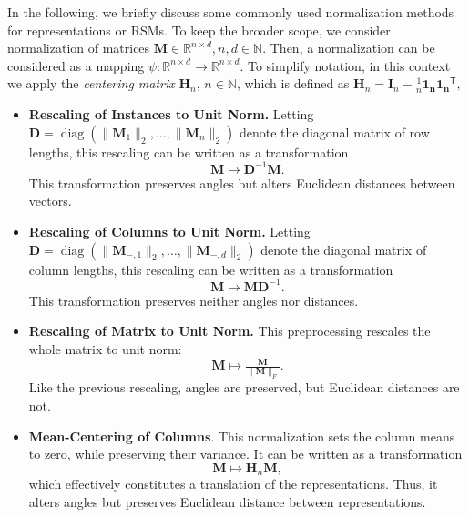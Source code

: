 \documentclass{article}
\newcommand{\Nat}{\mathbb{N}}
\newcommand{\Real}{\mathbb{R}}
\newcommand{\transp}{\mathsf{T}}
\begin{document}
\begin{refsegment}
In the following, we briefly discuss some commonly used normalization methods for representations or RSMs.
To keep the broader scope, we consider normalization of matrices $\bm{M}\in\Real^{n\times d}, n,d\in\Nat$.
Then, a normalization can be considered as a mapping $\psi:\Real^{n\times d} \longrightarrow \Real^{n\times d}$.
To simplify notation, in this context we apply the \emph{centering matrix} $\bm{H}_n$, $n\in\Nat$, which is defined as $\bm{H}_n = \bm{I}_n-\tfrac{1}{n}\bm{1_n}\bm{1_n}^\transp,$

\begin{itemize}
    \item \textbf{Rescaling of Instances to Unit Norm.} Letting $\bm{D} = \operatorname{diag}(\|\bm{M}_1\|_2,\dots,\|\bm{M}_n\|_2)$ denote the diagonal matrix of row lengths, this rescaling can be written as a transformation
    \begin{equation}\label{eq:unit_rescale}
     \bm{M} \mapsto \bm{D}^{-1}\bm{M}.
    \end{equation}
    This transformation preserves angles but alters Euclidean distances between vectors.

    \item \textbf{Rescaling of Columns to Unit Norm.} Letting $\bm{D} = \operatorname{diag}(\|\bm{M}_{-,1}\|_2,\dots,\|\bm{M}_{-,d}\|_2)$ denote the diagonal matrix of column lengths, this rescaling can be written as a transformation
    \begin{equation}\label{eq:unit_col_rescale}
     \bm{M} \mapsto \bm{M}\bm{D}^{-1}.
    \end{equation}
    This transformation preserves neither angles nor distances.

    \item \textbf{Rescaling of Matrix to Unit Norm.} This preprocessing rescales the whole matrix to unit norm:
    \begin{equation}\label{eq:matrix_norm_rescale}
        \bm{M} \mapsto \tfrac{\bm{M}}{\|\bm{M}\|_F}.
    \end{equation}
    Like the previous rescaling, angles are preserved, but Euclidean distances are not.

    \item \textbf{Mean-Centering of Columns}. This normalization sets the column means to zero, while preserving their variance.
    It can be written as a transformation
    \begin{equation}\label{eq:mean_center}
        \bm{M} \mapsto \bm{H}_n \bm{M},
    \end{equation}
    which effectively constitutes a translation of the representations.
    Thus, it alters angles but preserves Euclidean distance between representations. %


\end{itemize}
\end{refsegment}
\end{document}
